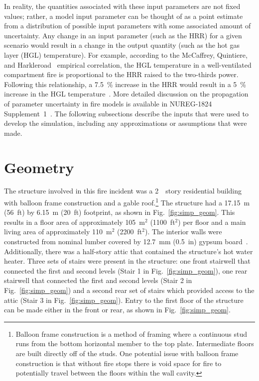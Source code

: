 \documentclass[12pt,oneside]{book}
\begin{document}
In reality, the quantities associated with these input parameters are not fixed values; rather, a model input parameter can be thought of as a point estimate from a distribution of possible input parameters with some associated amount of uncertainty. Any change in an input parameter (such as the HRR) for a given scenario would result in a change in the output quantity (such as the hot gas layer (HGL) temperature). For example, according to the McCaffrey, Quintiere, and Harkleroad~\cite{SFPE:Walton} empirical correlation, the HGL temperature in a well-ventilated compartment fire is proportional to the HRR raised to the two-thirds power. Following this relationship, a 7.5~\% increase in the HRR would result in a 5~\% increase in the HGL temperature~\cite{NUREG_1824_Sup_1}. More detailed discussion on the propagation of parameter uncertainty in fire models is available in NUREG-1824 Supplement~1~\cite{NUREG_1824_Sup_1}. The following subsections describe the inputs that were used to develop the simulation, including any approximations or assumptions that were made.

\section{Geometry}
\label{geom}
The structure involved in this fire incident was a 2~~story residential building with balloon frame construction and a gable roof.\footnote{Balloon frame construction is a method of framing where a continuous stud runs from the bottom horizontal member to the top plate. Intermediate floors are built directly off of the studs. One potential issue with balloon frame construction is that without fire stops there is void space for fire to potentially travel between the floors within the wall cavity.} The structure had a 17.15~m (56~ft) by 6.15~m (20~ft) footprint, as shown in Fig.~\ref{fig:simp_geom}. This results in a floor area of approximately 105~m$^2$ (1100~ft$^2$) per floor and a main living area of approximately 110~m$^2$ (2200~ft$^2$). The interior walls were constructed from nominal lumber covered by 12.7~mm (0.5~in) gypsum board~\cite{NIOSH:Bowyer}. Additionally, there was a half-story attic that contained the structure's hot water heater. Three sets of stairs were present in the structure: one front stairwell that connected the first and second levels (Stair 1 in Fig.~\ref{fig:simp_geom}), one rear stairwell that connected the first and second levels (Stair 2 in Fig.~\ref{fig:simp_geom}) and a second rear set of stairs which provided access to the attic (Stair 3 in Fig.~\ref{fig:simp_geom}). Entry to the first floor of the structure can be made either in the front or rear, as shown in Fig.~\ref{fig:simp_geom}.
\end{document}
